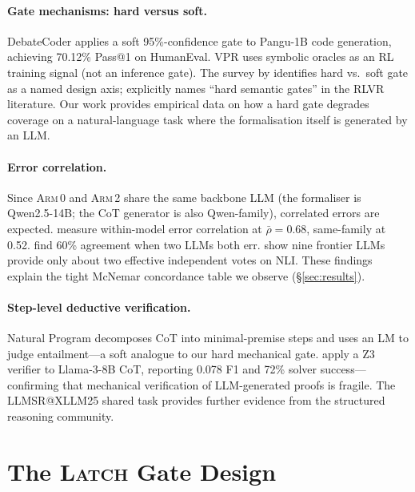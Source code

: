 \documentclass[11pt]{article}
\newcommand{\armi}{\textsc{Arm\,0}}
\newcommand{\armii}{\textsc{Arm\,2}}
\newcommand{\latch}{\textsc{Latch}}
\newcommand{\mcnem}{McNemar}
\begin{document}
\paragraph{Gate mechanisms: hard versus soft.}
DebateCoder \citep{debateCoder} applies a soft 95\%-confidence gate to
Pangu-1B code generation, achieving 70.12\% Pass@1 on HumanEval.  VPR
\citep{vpr} uses symbolic oracles as an RL training signal (not an
inference gate).  The survey by \citet{trustButVerify} identifies hard
vs.\ soft gate as a named design axis; \citet{generateFilter} explicitly
names ``hard semantic gates'' in the RLVR literature.  Our work provides
empirical data on how a hard gate degrades coverage on a natural-language
task where the formalisation itself is generated by an LLM.

\paragraph{Error correlation.}
Since \armi{} and \armii{} share the same backbone LLM (the formaliser is
Qwen2.5-14B; the CoT generator is also Qwen-family), correlated errors
are expected.  \citet{llmsJury} measure within-model error correlation at
$\bar\rho = 0.68$, same-family at 0.52.  \citet{correlatedErrors} find
60\% agreement when two LLMs both err.  \citet{nineJudges} show nine
frontier LLMs provide only about two effective independent votes on NLI.
These findings explain the tight \mcnem{} concordance table we observe
(§\ref{sec:results}).

\paragraph{Step-level deductive verification.}
Natural Program \citep{naturalProgram} decomposes CoT into minimal-premise
steps and uses an LM to judge entailment---a soft analogue to our hard
mechanical gate.  \citet{swrv} apply a Z3 verifier to Llama-3-8B CoT,
reporting 0.078 F1 and 72\% solver success---confirming that mechanical
verification of LLM-generated proofs is fragile.  The LLMSR@XLLM25
shared task \citep{llmsrTask,llmsrFifth,llmsrThird} provides further
evidence from the structured reasoning community.

\section{The \latch{} Gate Design}
\label{sec:design}
\end{document}
